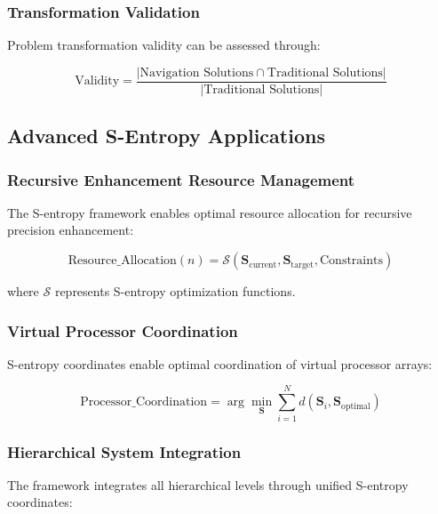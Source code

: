 \documentclass[12pt,a4paper]{article}
\begin{document}
{{{{{{{{{{{{{\subsubsection{Transformation Validation}

Problem transformation validity can be assessed through:

\begin{equation}
\text{Validity} = \frac{|\text{Navigation Solutions} \cap \text{Traditional Solutions}|}{|\text{Traditional Solutions}|}
\label{eq:transformation_validity}
\end{equation}

\subsection{Advanced S-Entropy Applications}

\subsubsection{Recursive Enhancement Resource Management}

The S-entropy framework enables optimal resource allocation for recursive precision enhancement:

\begin{equation}
\text{Resource\_Allocation}(n) = \mathcal{S}(\mathbf{S}_{\text{current}}, \mathbf{S}_{\text{target}}, \text{Constraints})
\end{equation}

where $\mathcal{S}$ represents S-entropy optimization functions.

\subsubsection{Virtual Processor Coordination}

S-entropy coordinates enable optimal coordination of virtual processor arrays:

\begin{equation}
\text{Processor\_Coordination} = \arg\min_{\mathbf{S}} \sum_{i=1}^{N} d(\mathbf{S}_i, \mathbf{S}_{\text{optimal}})
\end{equation}

\subsubsection{Hierarchical System Integration}

The framework integrates all hierarchical levels through unified S-entropy coordinates:

}}}}}}}}}}}}}
\end{document}

